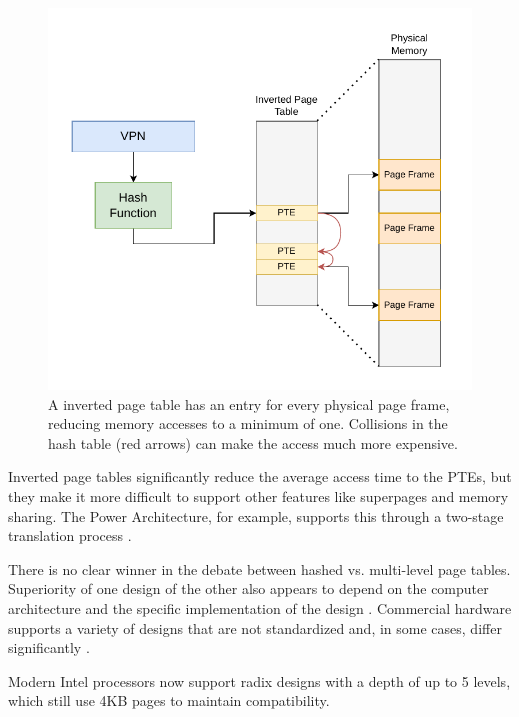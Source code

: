 \begin{figure}[t]
    \centering
    \includegraphics[scale=1]{figures/inverted_pt.pdf}
    \caption[Simple Inverted Page Table Design]{A inverted page table has an entry for every physical
        page frame, reducing memory accesses to a minimum of one. Collisions in the hash table (red arrows) can
        make the access much more expensive. }
    \label{fig:fund:inverted}
\end{figure}


Inverted page tables significantly reduce the average access time to the PTEs, but they make it
more difficult to support other features like superpages and memory sharing.
The Power Architecture, for example, supports this through a two-stage translation process \cite{yaniv2016hash}.


There is no clear winner in the debate between hashed vs. multi-level page tables.
Superiority of one design of the other also appears to depend on the computer architecture \cite{barrTranslationCachingSkip}
and the specific implementation of the design \cite{yaniv2016hash}.
Commercial hardware supports a variety of designs that are not standardized and, in some cases,
differ significantly \cite{jacob1998look}.


Modern Intel processors now support radix designs with a depth of up to 5 levels,
which still use 4KB pages to maintain compatibility.



